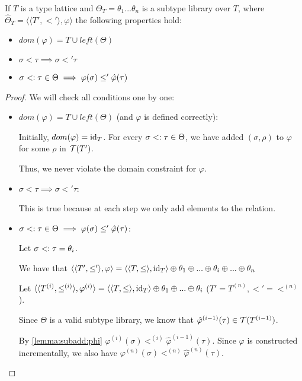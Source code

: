 \documentclass[main.tex]{subfiles}
\begin{document}
\begin{prop}
    If $T$ is a type lattice and
    $\Theta_T = \theta_1 ... \theta_n$ is a subtype library over $T$, where
    $\hat{\Theta}_T = \langle \langle T', \less' \rangle, \varphi \rangle$
    the following properties hold:
    \begin{itemize}
        \item $dom(\varphi) = T \cup left(\Theta)$
        \item $\sigma \less \tau \implies \sigma \less' \tau$
        \item $\sigma <: \tau \in \Theta \implies \varphi(\sigma) \leq' \hat{\varphi}(\tau)$
    \end{itemize}
\end{prop}
\begin{proof}
    We will check all conditions one by one:
    \begin{itemize}
        \item $dom(\varphi) = T \cup left(\Theta)$ (and $\varphi$ is defined correctly):

            Initially, $dom(\varphi) = \mathrm{id}_T$.
            For every $\sigma <: \tau \in \Theta$, we have added
            $(\sigma, \rho)$ to $\varphi$ for some $\rho$ in $\mathcal{T}( T' )$.

            Thus, we never violate the domain constraint for $\varphi$.

        \item $\sigma \less \tau \implies \sigma \less' \tau$:

            This is true because
            at each step we only add elements to the relation.
        \item $\sigma <: \tau \in \Theta \implies \varphi(\sigma) \leq' \hat{\varphi}(\tau)$:

            Let $\sigma <: \tau = \theta_i$.

            We have that
            $\langle \langle T', \leq' \rangle, \varphi \rangle
                = \langle \langle T, \leq \rangle, \mathrm{id}_T \rangle
                \oplus \theta_1 \oplus ... \oplus \theta_i \oplus ... \oplus \theta_n$

            Let
            $\langle \langle T^{(i)}, \leq^{(i)} \rangle, \varphi^{(i)} \rangle
                = \langle \langle T, \leq \rangle, \mathrm{id}_T \rangle
                \oplus \theta_1 \oplus ... \oplus \theta_i$ \quad ($T' = T^{(n)},
                \less' = \less^{(n)}$).

            Since $\Theta$ is a valid subtype library, we know that
            $\hat{\varphi}^{(i - 1)}(\tau) \in \mathcal{T}( T^{(i - 1)} )$.

            By \cref{lemma:subadd:phi} $\varphi^{(i)}(\sigma) \less^{(i)}
            \hat{\varphi}^{(i - 1)}(\tau)$. Since $\varphi$ is constructed
            incrementally, we also have $\varphi^{(n)}(\sigma) \less^{(n)}
            \hat{\varphi}^{(n)}(\tau)$.
    \end{itemize}
\end{proof}
\end{document}
